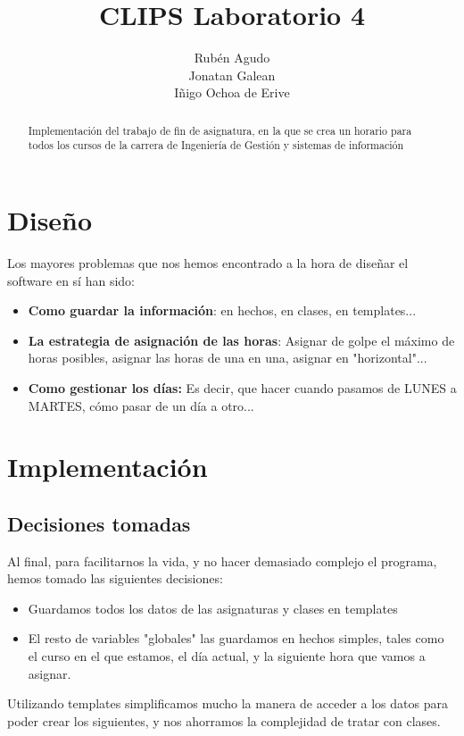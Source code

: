 \documentclass{report}
\title{CLIPS Laboratorio 4}
\author{Rub\'{e}n Agudo \\
    Jonatan Galean \\
    I\~{n}igo Ochoa de Erive}
\begin{document}
\maketitle
\tableofcontents

\begin{abstract}
    Implementaci\'{o}n del trabajo de fin de asignatura, en la que se crea un horario 
    para todos los cursos de la carrera de Ingenier\'{i}a de Gesti\'{o}n y sistemas de informaci\'{o}n
\end{abstract}

\chapter{Dise\~{n}o}
Los mayores problemas que nos hemos encontrado a la hora de dise\~{n}ar el software en s\'{i} han sido:
\begin{itemize}
	\item \textbf{Como guardar la informaci\'{o}n}: en hechos, en clases, en templates...
	\item \textbf{La estrategia de asignaci\'{o}n de las horas}: 
	Asignar de golpe el m\'{a}ximo de horas posibles, asignar las horas de una en una, asignar en "horizontal"...
	\item \textbf{Como gestionar los d\'{i}as:} Es decir, que hacer cuando pasamos de 
	LUNES a MARTES, c\'{o}mo pasar de un d\'{i}a a otro...
\end{itemize}

\chapter{Implementaci\'{o}n}

\section{Decisiones tomadas}

Al final, para facilitarnos la vida, y no hacer demasiado complejo el programa, hemos tomado las siguientes decisiones:
\begin{itemize}
	\item Guardamos todos los datos de las asignaturas y clases en templates
	\item El resto de variables "globales" las guardamos en hechos simples, tales como el curso en el que 
	estamos, el d\'{i}a actual, y la siguiente hora que vamos a asignar.
\end{itemize}

Utilizando templates simplificamos mucho la manera de acceder a los datos para poder crear los siguientes, y
nos ahorramos la complejidad de tratar con clases.
\end{document}

